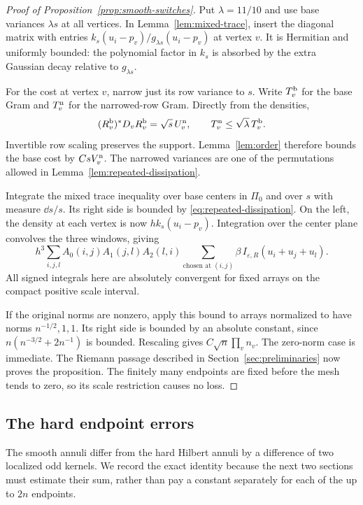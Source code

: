 \begin{proof}[Proof of Proposition~\ref{prop:smooth-switches}]
Put $\lambda=11/10$ and use base variances $\lambda s$ at all vertices.
In Lemma~\ref{lem:mixed-trace}, insert the diagonal matrix with entries
$k_s(u_i-p_v)/g_{\lambda s}(u_i-p_v)$ at vertex $v$.
It is Hermitian and uniformly bounded: the polynomial factor in $k_s$
is absorbed by the extra Gaussian decay relative to $g_{\lambda s}$.

For the cost at vertex $v$, narrow just its row variance to $s$.
Write $T_v^{\rm b}$ for the base Gram and $T_v^{\rm n}$ for the
narrowed-row Gram. Directly from the densities,
\[
 (R_v^{\rm b})^*D_vR_v^{\rm b}=\sqrt s\,U_v^{\rm n},
 \qquad T_v^{\rm n}\le\sqrt\lambda\,T_v^{\rm b}.
\]
Invertible row scaling preserves the support. Lemma~\ref{lem:order}
therefore bounds the base cost by $C sV_v^{\rm n}$.
The narrowed variances are one of the permutations allowed in
Lemma~\ref{lem:repeated-dissipation}.

Integrate the mixed trace inequality over base centers in $\Pi_0$ and
over $s$ with measure $\dd s/s$. Its right side is bounded by
\eqref{eq:repeated-dissipation}. On the left, the density at each
vertex is now $h k_s(u_i-p_v)$. Integration over the center plane
convolves the three windows, giving
\[
 h^3\sum_{i,j,l} A_0(i,j)A_1(j,l)A_2(l,i)
       \sum_{\text{chosen at }(i,j)}\beta\,
       I_{\varepsilon,R}(u_i+u_j+u_l).
\]
All signed integrals here are absolutely convergent for fixed arrays
on the compact positive scale interval.

If the original norms are nonzero, apply this bound to arrays normalized
to have norms $n^{-1/2},1,1$. Its right side is bounded by an absolute
constant, since $n(n^{-3/2}+2n^{-1})$ is bounded. Rescaling gives
$C\sqrt n\prod_vn_v$. The zero-norm case is immediate.
The Riemann passage described in Section~\ref{sec:preliminaries}
now proves the proposition. The finitely many endpoints are fixed
before the mesh tends to zero, so its scale restriction causes no loss.
\end{proof}

\subsection{The hard endpoint errors}

The smooth annuli differ from the hard Hilbert annuli by a difference
of two localized odd kernels. We record the exact identity because
the next two sections must estimate their sum, rather than pay a
constant separately for each of the up to $2n$ endpoints.

